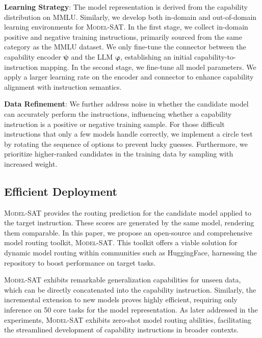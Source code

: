 \textbf{Learning Strategy}: The model representation is derived from the capability distribution on MMLU. Similarly, we develop both in-domain and out-of-domain learning environments for \textsc{Model-SAT}.
In the first stage, we collect in-domain positive and negative training instructions, primarily sourced from the same category as the MMLU dataset.
We only fine-tune the connector between the capability encoder $\boldsymbol{\psi}$ and the LLM $\boldsymbol{\varphi}$, establishing an initial capability-to-instruction mapping.
In the second stage, we fine-tune all model parameters.
We apply a larger learning rate on the encoder and connector to enhance capability alignment with instruction semantics.

\textbf{Data Refinement}: We further address noise in whether the candidate model can accurately perform the instructions, influencing whether a capability instruction is a positive or negative training sample.
For those difficult instructions that only a few models handle correctly, we implement a circle test by rotating the sequence of options to prevent lucky guesses.
Furthermore, we prioritize higher-ranked candidates in the training data by sampling with increased weight.


\subsection{Efficient Deployment}
\textsc{Model-SAT} provides the routing prediction for the candidate model applied to the target instruction.
These scores are generated by the same model, rendering them comparable.
In this paper, we propose an open-source and comprehensive model routing toolkit, \textsc{Model-SAT}.
This toolkit offers a viable solution for dynamic model routing within communities such as HuggingFace, harnessing the repository to boost performance on target tasks.

\textsc{Model-SAT} exhibits remarkable generalization capabilities for unseen data, which can be directly concatenated into the capability instruction.
Similarly, the incremental extension to new models proves highly efficient, requiring only inference on 50 core tasks for the model representation.
As later addressed in the experiments, \textsc{Model-SAT} exhibits zero-shot model routing abilities, facilitating the streamlined development of capability instructions in broader contexts.



